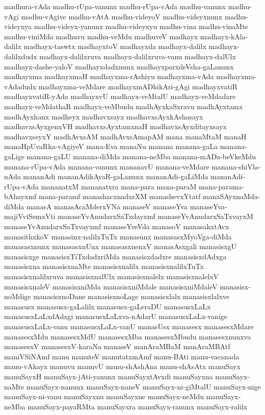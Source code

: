 {madhura-vAda
madhu-rUpa-vanunx
madhu-rUpa-vAda
madhu-vanunx
madhu-vAgi
madhu-vAgive
madhu-vAtA
madhu-videyoV
madhu-videyxnunx
madhu-videyxya
madhu-videyx-yanunx
madhu-videyxyu
madhu-vina
madhu-vinaMte
madhu-viniMda
madhuvu
madhu-veMdu
madhuveV
madhayx
madhayx-kAla-dalilx
madhayx-taswtx
madhayxtoV
madhayxda
madhayx-dalilx
madhayx-dalilxdudx
madhayx-dalilxruva
madhayx-dalilxruva-vanu
madhayx-dalUlx
madhayx-dashe-yaloV
madhayxdadxnunx
madhayxparxdeVsha-gaLanunx
madhayxma
madhayxmaH
madhayxma-rAshiyu
madhayxma-vAda
madhayxma-vAdadudx
madhayxma-veMdare
madhayxmADhikAri-gAgi
madhayxvatiR
madhayxvatiR-yAda
madhayxvU
madhayx-veMtalU
madhayx-veMdadare
madhayx-veMdathaR
madhayx-veMbudu
madhAyxkaSxravu
madhAyxtamx
madhAyxhanx
madheyx
madhavxsayx
madhavxsAyxkAshasayx
madhavxsAyxgenxVH
madhavxsAyxtamxnaH
madhavxsAyxditayxsayx
madhavxseyxY
madhAvxsAM
madhAvxsAmapAM
mana
manaMtaM
manaH
manaHpUvaRka-vAgiyeV
mana-Eva
manaNu
manana
manana-gaLa
manana-gaLige
manana-gaLU
manana-diMda
manana-neMba
manana-mADa-beVkeMdu
manana-rUpa-vAda
manana-vanunx
mananavU
manana-veMdare
manana-shiVla-nAda
mananAdi
mananAdikAyaR-gaLanunx
mananAdi-gaLiMda
mananAdi-rUpa-vAda
mananatxM
mananatxra
mana-para
mana-paraM
mana-parama-bAhayxmf
mana-paramf
manashacxnadxrXM
manashevxYtatf
manaSAyxnaMda-diMda
manasA
manasAcaMderxVNa
manaseV
manaseYva
manaseYva-majiVviSemxVti
manaseYvAnudarxSaTxdayxmf
manaseYvAnudarxSaTxvayxM
manaseYvAnudarxSaTxvayxmf
manaseYveVda
manasoV
manasakxtAvx
manasithxkoV
manasinx-nalilxTuTx
manasunx
manasasxMyoVga-diMda
manasasxnunx
manasasxnUnx
manasasxnenxV
manasAsxgali
manasisxgU
manasisxge
manasisxTiTxdadxriMda
manasisxdadxre
manasisxdAdxga
manasisxna
manasisxnaMte
manasisxnalilx
manasisxnalilxTuTx
manasisxnalilxruva
manasisxnalUlx
manasisxnalelx
manasisxnalelxV
manasisxnaleV
manasisxniMda
manasisxniMdale
manasisxniMdaleV
manasisx-noMdige
manasisxnoDane
manasisxnoLage
manasisxlalx
manasisxlalxve
manasusx
manasusx-gaLalilx
manasusx-gaLeraDU
manasusxLaLx
manasusxLaLxdAdxgi
manasusxLaLxva-nAdarU
manasusxLaLx-vanige
manasusxLaLx-vanu
manasusxLaLx-vanU
manasUsx
manasesx
manasesxMdare
manasesxMdu
manasesxMdU
manasesxMba
manasesxMbudu
manasesxnunxva
manasesxV
manasesxV-karaNa
manaseV
manAraMBaM
manAraMBAtf
maniVSiNAmf
manu
manuteV
manutatxmAmf
manu-BAti
manu-vacanada
manu-vAkayx
manuvu
manuvU
manu-shAshAna
manu-shAsAtx
manuSayx
manuSayxH
manuSayx-jAti-yanunx
manuSayxtAvxdi
manuSayxna
manuSayx-naMte
manuSayx-nanunx
manuSayx-naneV
manuSayx-ni-giMtalU
manuSayx-nige
manuSayx-ni-vanu
manuSayxnu
manuSayxne
manuSayx-neMdu
manuSayx-neMba
manuSayx-payaRMta
manuSayxra
manuSayx-ranunx
manuSayx-ralilx
}
